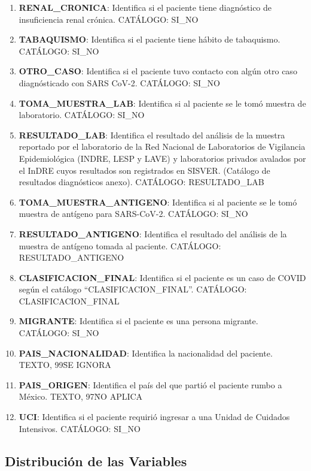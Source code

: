 \begin{enumerate}
	\item \textbf{RENAL\_CRONICA}: Identifica si el paciente tiene diagnóstico de insuficiencia renal crónica. CATÁLOGO: SI\_NO                                                                  
	\item \textbf{TABAQUISMO}: Identifica si el paciente tiene hábito de tabaquismo. CATÁLOGO: SI\_NO
	\item \textbf{OTRO\_CASO}: Identifica si el paciente tuvo contacto con algún otro caso diagnósticado con SARS CoV-2. CATÁLOGO: SI\_NO                                                                   
	\item \textbf{TOMA\_MUESTRA\_LAB}: Identifica si al paciente se le tomó muestra de laboratorio. CATÁLOGO: SI\_NO
	\item \textbf{RESULTADO\_LAB}: Identifica el resultado del análisis de la muestra reportado por el  laboratorio de la Red Nacional de Laboratorios de Vigilancia Epidemiológica (INDRE, LESP y LAVE) y laboratorios privados avalados por el InDRE cuyos resultados son registrados en SISVER. (Catálogo de resultados diagnósticos anexo). CATÁLOGO: RESULTADO\_LAB
	\item \textbf{TOMA\_MUESTRA\_ANTIGENO}: Identifica si al paciente se le tomó muestra de antígeno para SARS-CoV-2. CATÁLOGO: SI\_NO
	\item \textbf{RESULTADO\_ANTIGENO}: Identifica el resultado del análisis de la muestra de antígeno tomada al paciente. CATÁLOGO: RESULTADO\_ANTIGENO
	\item \textbf{CLASIFICACION\_FINAL}: Identifica si el paciente es un caso de COVID según el catálogo ``CLASIFICACION\_FINAL''. CATÁLOGO: CLASIFICACION\_FINAL
	\item \textbf{MIGRANTE}: Identifica si el paciente es una persona migrante. CATÁLOGO: SI\_NO                                                                  
	\item \textbf{PAIS\_NACIONALIDAD}: Identifica la nacionalidad del paciente. TEXTO, 99\=SE IGNORA
	\item \textbf{PAIS\_ORIGEN}: Identifica el país del que partió el paciente rumbo a México. TEXTO, 97\=NO APLICA
	\item \textbf{UCI}: Identifica si el paciente requirió ingresar a una Unidad de Cuidados Intensivos. CATÁLOGO: SI\_NO                                                                  
\end{enumerate}

\clearpage

\subsection{Distribución de las Variables}
